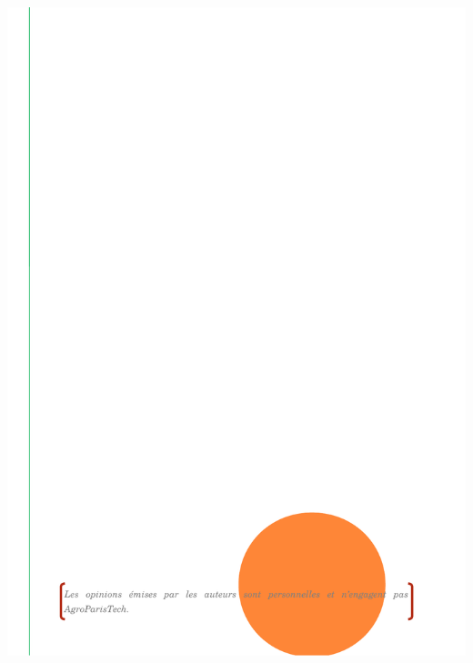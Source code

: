 \thispagestyle{empty}
\begin{center}
\includegraphics{images/second.pdf}
\end{center}

\setlength{\abovedisplayskip}{-5pt}
\setlength{\abovedisplayshortskip}{-5pt}

